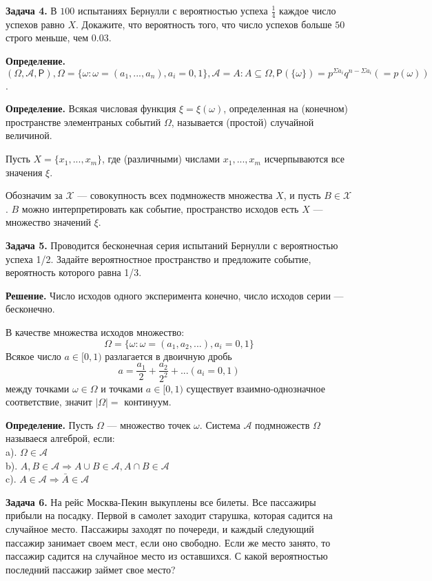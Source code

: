 \documentclass{article}
\begin{document}
\textbf{Задача 4.}
В $100$ испытаниях Бернулли с вероятностью успеха $\frac{1}{4}$ каждое число успехов равно $X$. Докажите, что вероятность того, что число успехов больше $50$ строго меньше, чем $0.03$.

\textbf{Определение.} $
(\Omega,
\mathscr A,
\mathsf P),
\Omega=\{\omega:\omega=(a_1,...,a_n), a_i=0,1\},
\mathscr A={A: A\subseteq\Omega},
\mathsf{P}(\{\omega\})=p^{\Sigma a_i}q^{n-\Sigma a_i} (=p(\omega))$
\cite[69]{sh}.

\textbf{Определение. }
Всякая числовая функция $\xi=\xi(\omega)$, определенная на (конечном) пространстве элементраных событий $\Omega$, называется (простой) случайной величиной.

Пусть $X=\{x_1,...,x_m\}$, где (различными) числами $x_1,...,x_m$ исчерпываются все значения $\xi$.

Обозначим за $\mathscr X$ --- совокупность всех подмножеств множества $X$, и пусть $B\in\mathscr X$. $B$ можно интерпретировать как событие, пространство исходов есть $X$ --- множество значений $\xi$\cite[56]{sh}.


\textbf{Задача 5.}
Проводится бесконечная серия испытаний Бернулли с вероятностью успеха 1/2. Задайте вероятностное пространство и предложите событие, вероятность которого равна 1/3.

\textbf{Решение.}
Число исходов одного эксперимента конечно, число исходов серии --- бесконечно\cite[192]{sh}.

В качестве множества исходов множество:
$$\Omega=\{\omega:\omega=(a_1,a_2,...), a_i=0,1\}$$
Всякое число $a\in[0,1)$
разлагается в двоичную дробь
$$a=\frac{a_1}{2}+\frac{a_2}{2^2}+...(a_i=0,1)$$
между точками $\omega\in\Omega$ и точками $a\in[0,1)$ существует взаимно-однозначное соответствие, значит $|\Omega|=$ континуум.

\textbf{Определение.} Пусть $\Omega$ --- множество точек $\omega$. Система $\mathscr A$ подмножеств $\Omega$ называеся алгеброй, если:\\
a). $\Omega\in\mathscr A$\\
b). $A,B\in\mathscr A\Rightarrow A\cup B\in\mathscr A, A\cap B\in \mathscr A$\\
c). $A\in\mathscr A\Rightarrow\bar A\in\mathscr A$



\textbf{Задача 6.}
На рейс Москва-Пекин выкуплены все билеты. Все пассажиры прибыли на посадку. Первой в самолет заходит старушка, которая садится на случайное место. Пассажиры заходят по почереди, и каждый следующий пассажир занимает своем мест, если оно свободно. Если же место занято, то пассажир садится на случайное место из оставшихся. С какой вероятностью последний пассажир займет свое место?
\end{document}
